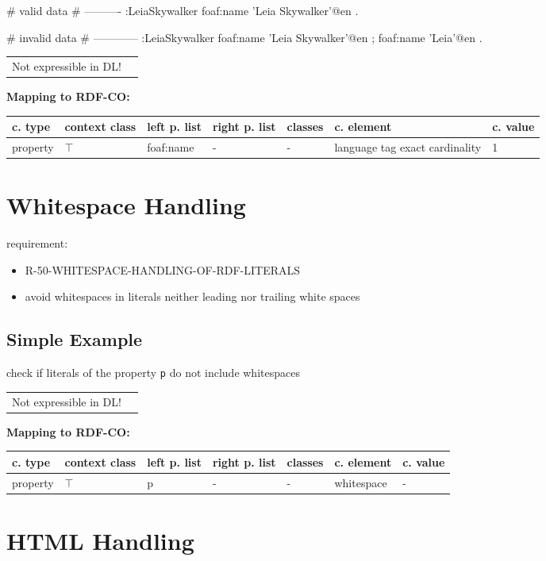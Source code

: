 \documentclass{llncs}
\newcommand{\ms}[1]{\texttt{#1}}
\newenvironment{gcotable}{
  \scriptsize
  \sffamily
  \vspace{0cm}
	\begin{center}
	\textbf{\vspace{0.4cm}Mapping to RDF-CO:} \\
  \begin{tabular}{l|l|l|l|l|l|l}
	\hline
  \textbf{c. type} & \textbf{context class} & \textbf{left p. list} & \textbf{right p. list} & \textbf{classes} & \textbf{c. element} & \textbf{c. value} \\
  \hline

}{
  \hline
  \end{tabular}
	\end{center}
}
\newenvironment{DL}{
  \vspace{0cm}
	\begin{center}
  \begin{tabular}{r l}

}{
  \end{tabular}
	\end{center}
}
\begin{document}
\begin{ex}
# valid data
# ----------
:LeiaSkywalker
    foaf:name 'Leia Skywalker'@en .
\end{ex}

\begin{ex}
# invalid data
# ------------
:LeiaSkywalker
    foaf:name 'Leia Skywalker'@en ;
    foaf:name 'Leia'@en .
\end{ex}

\begin{DL}
Not expressible in DL!
\end{DL}

\begin{gcotable}
property & $\top$ & foaf:name & - & - & language tag exact cardinality & 1 \\
\end{gcotable}

\section{Whitespace Handling}

requirement:

\begin{itemize}
	\item R-50-WHITESPACE-HANDLING-OF-RDF-LITERALS
\end{itemize}

\begin{itemize}
	\item avoid whitespaces in literals neither leading nor trailing white spaces
\end{itemize}

\subsection{Simple Example}

check if literals of the property \ms{p} do not include whitespaces

\begin{DL}
Not expressible in DL!
\end{DL}

\begin{gcotable}
property & $\top$ & p & - & - & whitespace & - \\
\end{gcotable}

\section{HTML Handling}
\end{document}
